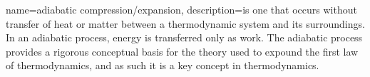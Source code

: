 {
    name=adiabatic compression/expansion,
    description={is one that occurs without transfer of heat or matter between a thermodynamic system and its surroundings. In an adiabatic process, energy is transferred only as work. The adiabatic process provides a rigorous conceptual basis for the theory used to expound the first law of thermodynamics, and as such it is a key concept in thermodynamics.}
}
